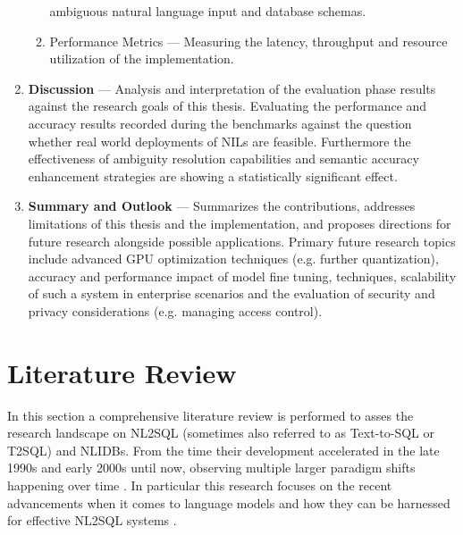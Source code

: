 \documentclass{article}
\begin{document}
\begin{enumerate}
\begin{enumerate}
                    ambiguous natural language input and database schemas.
              \item Performance Metrics — Measuring the latency, throughput and resource utilization 
                    of the implementation.
          \end{enumerate}
      \item \textbf{Discussion} — Analysis and interpretation of the evaluation phase results against
            the research goals of this thesis. Evaluating the performance and accuracy results recorded
            during the benchmarks against the question whether real world deployments of NILs are feasible.
            Furthermore the effectiveness of ambiguity resolution capabilities and semantic accuracy enhancement
            strategies are showing a statistically significant effect.
       \item \textbf{Summary and Outlook} — Summarizes the contributions, addresses limitations
            of this thesis and the implementation, and proposes directions for future research alongside
            possible applications. Primary future research topics include advanced GPU optimization
            techniques (e.g. further quantization), accuracy and performance impact of model fine tuning,
            techniques, scalability of such a system in enterprise scenarios and the evaluation of security
            and privacy considerations (e.g. managing access control).
\end{enumerate}

\newpage

\section{Literature Review}


In this section a comprehensive literature review is performed to asses the research landscape on NL2SQL
(sometimes also referred to as Text-to-SQL or T2SQL) and NLIDBs. From the time their development accelerated in
the late 1990s and early 2000s \citep{NLIDBs, NLIDBTheory, ILPParsing, ILPParsing2} until now, observing multiple 
larger paradigm shifts happening over time \citep{GRAPPA, STRUG, Seq2SQL, NALIR, SQLizer}. In particular this 
research focuses on the recent advancements when it comes to language models and how they can be harnessed for
effective NL2SQL systems \citep{LLM-Sql, DAIL-SQL, T2SQL-LLM-Bench-2, T2SQL-LLM-Bench-3, SPIDER2, BIRD}.
\end{document}
